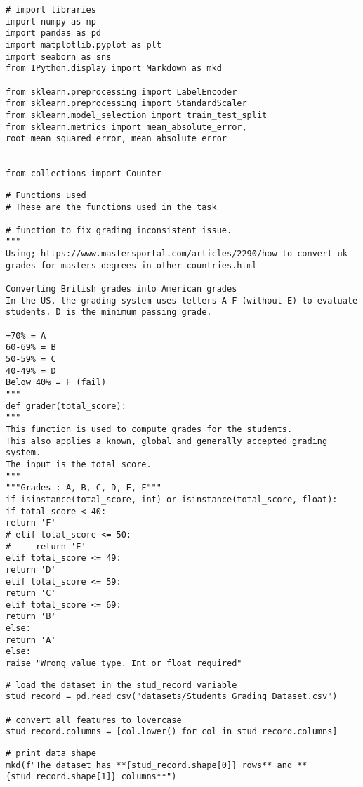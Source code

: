
\label{code:import_packages}
\begin{verbatim}
# import libraries
import numpy as np
import pandas as pd
import matplotlib.pyplot as plt
import seaborn as sns 
from IPython.display import Markdown as mkd 

from sklearn.preprocessing import LabelEncoder
from sklearn.preprocessing import StandardScaler
from sklearn.model_selection import train_test_split
from sklearn.metrics import mean_absolute_error, root_mean_squared_error, mean_absolute_error


from collections import Counter
\end{verbatim}

\label{code:functions_used}
\begin{verbatim}
# Functions used
# These are the functions used in the task

# function to fix grading inconsistent issue.
"""
Using; https://www.mastersportal.com/articles/2290/how-to-convert-uk-grades-for-masters-degrees-in-other-countries.html

Converting British grades into American grades
In the US, the grading system uses letters A-F (without E) to evaluate students. D is the minimum passing grade.

+70% = A
60-69% = B
50-59% = C
40-49% = D
Below 40% = F (fail)
"""
def grader(total_score):
"""
This function is used to compute grades for the students. 
This also applies a known, global and generally accepted grading system.
The input is the total score.
"""
"""Grades : A, B, C, D, E, F"""
if isinstance(total_score, int) or isinstance(total_score, float):
if total_score < 40:
return 'F'
# elif total_score <= 50:
#     return 'E' 
elif total_score <= 49:
return 'D' 
elif total_score <= 59:
return 'C'
elif total_score <= 69:
return 'B' 
else:
return 'A'
else:
raise "Wrong value type. Int or float required" 
\end{verbatim}


\label{code:load_dataset}
\begin{verbatim}
# load the dataset in the stud_record variable
stud_record = pd.read_csv("datasets/Students_Grading_Dataset.csv")

# convert all features to lovercase 
stud_record.columns = [col.lower() for col in stud_record.columns]
\end{verbatim}

\label{code:data_shape}
\begin{verbatim}
# print data shape
mkd(f"The dataset has **{stud_record.shape[0]} rows** and **{stud_record.shape[1]} columns**")
\end{verbatim}

